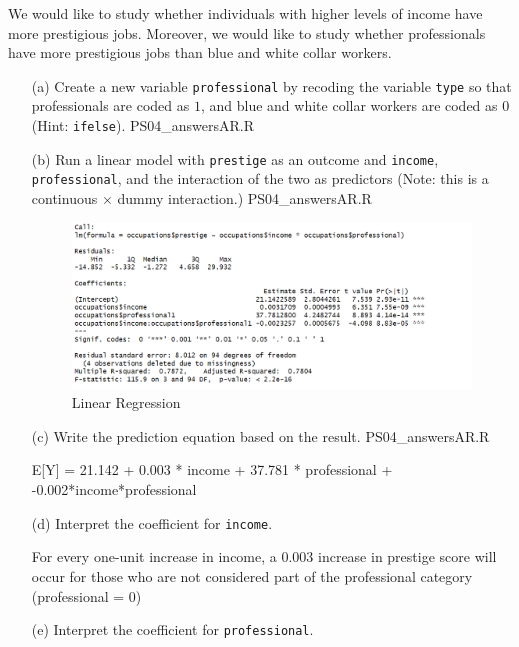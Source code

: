 \documentclass[12pt,letterpaper]{article}
\begin{document}
\noindent We would like to study whether individuals with higher levels of income have more prestigious jobs. Moreover, we would like to study whether professionals have more prestigious jobs than blue and white collar workers.
\newpage
\begin{enumerate}
	 {PS04_answersAR.R}
	\item [(a)]
	Create a new variable \texttt{professional} by recoding the variable \texttt{type} so that professionals are coded as $1$, and blue and white collar workers are coded as $0$ (Hint: \texttt{ifelse}).
	 {PS04_answersAR.R}
	
	\item [(b)]
	Run a linear model with \texttt{prestige} as an outcome and \texttt{income}, \texttt{professional}, and the interaction of the two as predictors (Note: this is a continuous $\times$ dummy interaction.)
	 {PS04_answersAR.R}
\begin{figure}[h!]\centering
	\caption{\footnotesize Linear Regression}
	\label{}
	\includegraphics[width=.85\textwidth]{question1_regression.png}
\end{figure}
\newpage
	\item [(c)]
	Write the prediction equation based on the result.
	 {PS04_answersAR.R}
	\begin{center}
		E[Y] = 21.142 + 0.003 * income + 37.781 * professional + -0.002*income*professional
	\end{center}
	
	\item [(d)]
	Interpret the coefficient for \texttt{income}.
	
	For every one-unit increase in income, a 0.003 increase in prestige score will occur for those who are not considered part of the professional category (professional = 0)
	\vspace{.5cm}
	\item [(e)]
	Interpret the coefficient for \texttt{professional}.
	

\end{enumerate}
\end{document}
